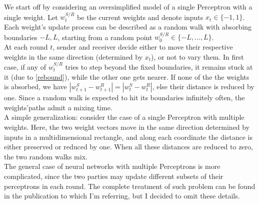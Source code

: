 \documentclass[%
    corpo=11pt,
    twoside,
    stile=classica,
    oldstyle,
    autoretitolo,
    tipotesi=magistrale,
    greek,
    evenboxes,
    english
]{toptesi}
\begin{document}
 We start off by considering an oversimplified model of a single Perceptron with a single weight. \iftrue Let $w^{S/R}_{t}$  be the current weights and denote inputs $x_{t} \in \{-1,1\} $. \fi Each weight's update process can be described as a random walk with absorbing boundaries $-L,L$, starting from a random point $w^{S/R}_{0}\in\{-L,\dots ,L\}$. \\
At each round $t$, sender and receiver decide either to move their respective weights in the same direction (determined by $x_t$), or not to vary them. In first case, if any of $w^{S/R}_t$ tries to step beyond the fixed boundaries, it remains stuck at it (due to \ref{rebound}), while the other one gets nearer.  If none of the the weights is absorbed, we have $|w_{t+1}^S - w_{t+1}^R| = |w_{t}^S - w_{t}^R|$, else their distance is reduced by one. Since a random walk is expected to hit its boundaries infinitely often, the weights'paths admit a mixing time. \\
A simple generalization: consider the case of a single Perceptron with multiple weights. Here, the two weight vectors move in the same direction determined by inputs in a multidimensional rectangle, and along each coordinate the distance is either preserved or reduced by one. When all these distances are reduced to zero, the two random walks mix. \\
The general case of neural networks with multiple Perceptrons is more complicated, since the two parties may update different subsets of their perceptrons in each round. The complete treatment of such problem can be found in the publication to which I'm referring, but I decided to omit these details.
\end{document}
